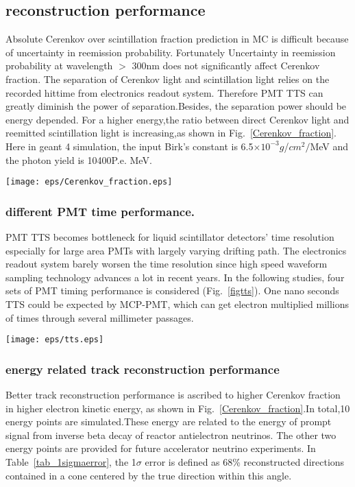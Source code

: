 \documentclass[a4paper,10pt]{cpc-hepnp}
\begin{document}

\subsection{reconstruction performance}
Absolute Cerenkov over scintillation fraction prediction in MC is difficult because of uncertainty in reemission probability.
Fortunately Uncertainty  in  reemission  probability  at  wavelength $>$ 300nm does not significantly affect Cerenkov fraction\cite{DocDB9847}.
The separation of Cerenkov light and scintillation light relies on the recorded hittime from electronics readout system.
Therefore PMT TTS can greatly diminish the power of separation.Besides, the separation power should be energy depended.
For a higher energy,the ratio between direct Cerenkov light and reemitted scintillation light is increasing,as shown in Fig.~\ref{Cerenkov_fraction}.
Here in geant 4 simulation, the input Birk's constant is 6.5$\times10^{-3}g$/$cm^{2}$$/$MeV and the photon yield
is 10400P.e. \/MeV.
\begin{center}
\texttt{[image: eps/Cerenkov\_fraction.eps]}
\end{center}
\subsubsection{different PMT time performance.}
PMT TTS becomes bottleneck for liquid scintillator detectors' time resolution especially for large area
PMTs with largely varying drifting path. The electronics readout system barely worsen the time resolution
since high speed waveform sampling technology advances a lot in recent years. In the following studies, four sets of
PMT timing performance is considered  (Fig.~\ref{figtts}). One nano seconds TTS could be expected by MCP-PMT,
which can get electron multiplied
millions of times through several millimeter passages.

\begin{center}
\texttt{[image: eps/tts.eps]}
\end{center}

\subsubsection{energy related track reconstruction performance}
Better track reconstruction performance is ascribed to higher Cerenkov fraction in higher electron kinetic energy,
as shown in Fig.~\ref{Cerenkov_fraction}.In total,10 energy points are simulated.These energy are related to the
energy of prompt signal
from inverse beta decay of reactor antielectron neutrinos. The other two  energy points are provided for future
accelerator neutrino experiments. In  Table~\ref{tab_1sigmaerror}, the 1$\sigma$ error is defined as 68\% reconstructed directions
contained in a cone centered by the true direction within this angle.
\end{document}
